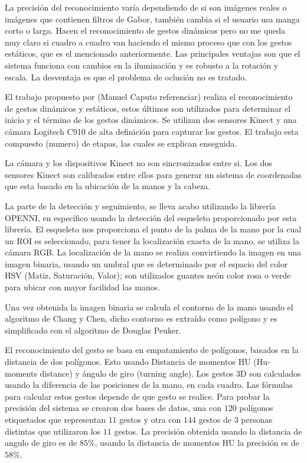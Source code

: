 La precisión del reconocimiento varía dependiendo de si son imágenes reales o imágenes que contienen filtros de Gabor, también cambia si el usuario usa manga corto o larga. Hacen el reconocimiento de gestos dinámicos pero no me queda muy claro si cuadro a cuadro van haciendo el mismo proceso que con los gestos estáticos, que es el mencionado anteriormente. 
Las principales ventajas son que el sistema funciona con cambios en la iluminación y es robusto a la rotación y escala. La desventaja es que el problema de oclusi\'on no es tratado. 


El trabajo propuesto por (Manuel Caputo referenciar) realiza el reconocimiento de gestos dinámicos y estáticos, estos últimos son utilizados para determinar el inicio y el término de los gestos dinámicos.  Se utilizan  dos sensores Kinect y una cámara Logitech C910 de alta definición para capturar los gestos. El trabajo esta compuesto (numero) de etapas, las cuales se explican enseguida. 

La cámara y los dispositivos Kinect no son sincronizados entre si. Los dos sensores Kinect son calibrados entre ellos para generar un sistema de coordenadas que esta basado en la ubicación de la  manos y la cabeza. 

La parte de la detección y seguimiento, se lleva acabo utilizando la librería OPENNI, en específico usando la detección del esqueleto proporcionado por esta librería. El esqueleto nos proporciona el punto de la palma de la mano por la cual un ROI es seleccionado, para tener la localización exacta de la mano, se utiliza la cámara RGB. La localización de la mano se realiza convirtiendo la imagen en una imagen binaria, usando un umbral que es determinado por el espacio del color HSV (Matiz, Saturación, Valor); son utilizados guantes neón color rosa o verde para ubicar con mayor facilidad las manos.   

Una vez obtenida la imagen binaria se calcula el contorno de la mano usando el algoritmo de Chang y Chen, dicho contorno es extraído como polígono y  es simplificado con el algoritmo de Douglas Peuker. 

El reconocimiento del gesto se basa en empatamiento de polígonos, basados en la distancia de dos polígonos. Esto usando Distancia de momentos HU (Hu-moments distance) y ángulo de giro (turning angle). 
Los gestos 3D son calculados usando la diferencia de las posiciones de la mano, en cada cuadro. Las fórmulas para calcular estos gestos depende de que gesto se  realice.  
Para probar la precisión del sistema se crearon dos bases de datos, una con $120$ polígonos etiquetados que representan $11$ gestos y otra con $144$ gestos de $3$ personas distintas que utilizaron los $11$ gestos. La precisión obtenida usando la distancia de angulo de giro es de $85 \%$, usando la distancia de momentos HU la precisión es de $58 \%$.  

